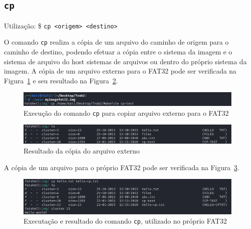 \documentclass[
    12pt,				%
    oneside,   	        %
    a4paper,			%
    english,			%
    french,				%
    spanish,			%
    brazil,				%
    ]{pacotes/abntex2}
\begin{document}

\subsection{\texttt{cp}}
\label{subsec:cp}
Utilização: \$ \texttt{cp <origem> <destino>}  

O comando \texttt{cp} realiza a cópia de um arquivo do caminho de origem para o caminho de destino, podendo efetuar a cópia entre o sistema da imagem e o sistema de arquivo do host sistemas de arquivos ou dentro do próprio sistema da imagem. A cópia de um arquivo externo para o FAT32 pode ser verificada na Figura~\ref{fig:cp-externo-interno-1} e seu resultado na Figura~\ref{fig:cp-externo-interno-2}.

\begin{figure}[H]
    \centering
    \includegraphics[width=450pt]{figuras/resultados/3.1-cp-externo-interno.PNG}
    \caption{Execução do comando \texttt{cp} para copiar arquivo externo para o FAT32}
    \label{fig:cp-externo-interno-1}
\end{figure}

\begin{figure}[H]
    \centering
    \includegraphics[width=450pt]{figuras/resultados/3.2-cp-externo-interno.PNG}
    \caption{Resultado da cópia do arquivo externo}
    \label{fig:cp-externo-interno-2}
\end{figure}

A cópia de um arquivo para o próprio FAT32 pode ser verificada na Figura~\ref{fig:cp-interno-attr}.

\begin{figure}[H]
    \centering
    \includegraphics[width=450pt]{figuras/resultados/5-cp-interno-attr.PNG}
    \caption{Executação e resultado do comando \texttt{cp}, utilizado no próprio FAT32}
    \label{fig:cp-interno-attr}
\end{figure}
\end{document}

